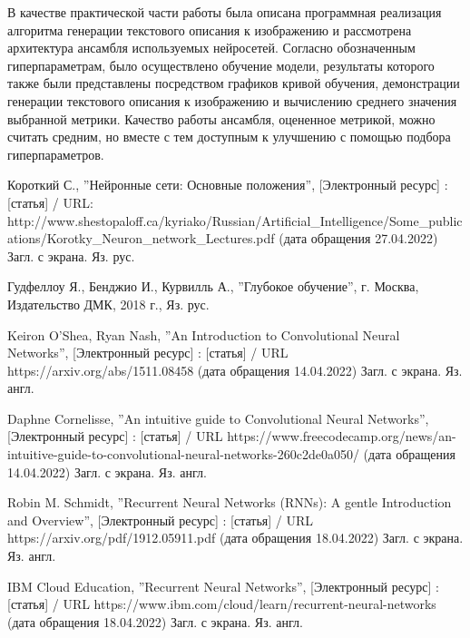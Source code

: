\documentclass[bachelor, och, coursework]{SCWorks}
\begin{document}
    В качестве практической части работы была описана программная реализация
    алгоритма генерации текстового описания к изображению и рассмотрена
    архитектура ансамбля используемых нейросетей. Согласно обозначенным
    гиперпараметрам, было осуществлено обучение модели, результаты которого
    также были представлены посредством графиков кривой обучения, демонстрации
    генерации текстового описания к изображению и вычислению среднего значения
    выбранной метрики. Качество работы ансамбля, оцененное метрикой, можно
    считать средним, но вместе с тем доступным к улучшению с помощью подбора
    гиперпараметров.

\begin{thebibliography}{99}
     Короткий С., ''Нейронные сети: Основные положения'',
    [Электронный ресурс] : [статья] / URL:
    http://www.shestopaloff.ca/kyriako/Russian/Artificial_Intelligence/Some_publications/Korotky_Neuron_network_Lectures.pdf
    (дата обращения 27.04.2022) Загл. с экрана. Яз. рус.
    
     Гудфеллоу Я., Бенджио И., Курвилль А., ''Глубокое обучение'',
    г. Москва, Издательство ДМК, 2018 г., Яз. рус.
    

     Keiron O'Shea, Ryan Nash, ''An Introduction to Convolutional
    Neural Networks'', [Электронный ресурс] : [статья] / URL
    https://arxiv.org/abs/1511.08458 (дата обращения 14.04.2022) Загл. с экрана.
    Яз. англ.
    
     Daphne Cornelisse, ''An intuitive guide to Convolutional
    Neural Networks'', [Электронный ресурс] : [статья] / URL
    https://www.freecodecamp.org/news/an-intuitive-guide-to-convolutional-neural-networks-260c2de0a050/
    (дата обращения 14.04.2022) Загл. с экрана. Яз. англ.

    
     Robin M. Schmidt, ''Recurrent Neural Networks (RNNs): A
    gentle Introduction and Overview'', [Электронный ресурс] : [статья] / URL
    https://arxiv.org/pdf/1912.05911.pdf (дата обращения 18.04.2022) Загл. с
    экрана. Яз. англ.

     IBM Cloud Education, ''Recurrent Neural Networks'',
    [Электронный ресурс] : [статья] / URL
    https://www.ibm.com/cloud/learn/recurrent-neural-networks (дата обращения
    18.04.2022) Загл. с экрана. Яз. англ.


\end{thebibliography}
\end{document}
